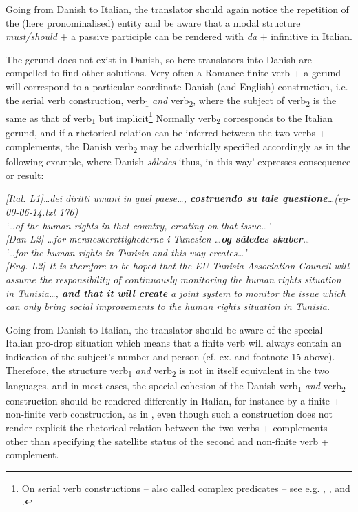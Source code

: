 \documentclass[output=paper]{LSP/langsci}
\begin{document}
Going from Danish to Italian, the translator should again notice the repetition of the (here pronominalised) entity and be aware that a modal structure \textit{must/should }+ a passive participle can be rendered with \textit{da} + infinitive in Italian.

The gerund does not exist in Danish, so here translators into Danish are compelled to find other solutions. Very often a Romance finite verb + a gerund will correspond to a particular coordinate Danish (and English) construction, i.e. the serial verb construction, verb\textsubscript{1} \textit{and} verb\textsubscript{2}, where the subject of verb\textsubscript{2} is the same as that of verb\textsubscript{1} but implicit\footnote{On serial verb constructions -- also called complex predicates -- see e.g. \citet[189]{Lehmann1988}, \citet{Herslund2000}, \citet{Choi2003} and \citet{Aikhenvald2005}.} Normally verb\textsubscript{2} corresponds to the Italian gerund, and if a rhetorical relation can be inferred between the two verbs + complements, the Danish verb\textsubscript{2} may be adverbially specified accordingly as in the following example, where Danish \textit{således} `thus, in this way' expresses consequence or result:

\ea\label{ex:korzen:19}
 \textit{\textup{[Ital. L1]}\ldots dei diritti umani in quel paese\ldots , \textbf{costruendo su tale questione}\ldots  \textup{(ep-00-06-14.txt 176)}\\
  `\ldots of the human rights in that country, creating on that issue\ldots '\\
  \textup{[Dan L2] }\ldots for menneskerettighederne i Tunesien \ldots  \textbf{og således skaber}\ldots \\
  `\ldots for the human rights in Tunisia and this way creates\ldots '\\
  \textup{[Eng. L2]} It is therefore to be hoped that the EU-Tunisia Association Council will assume the responsibility of continuously monitoring the human rights situation in Tunisia\ldots , \textbf{and that it will create} a joint system to monitor the issue which can only bring social improvements to the human rights situation in Tunisia.}\\
\z

Going from Danish to Italian, the translator should be aware of the special Italian pro-drop situation which means that a finite verb will always contain an indication of the subject's number and person (cf. ex.  and footnote 15 above). Therefore, the structure verb\textsubscript{1} \textit{and} verb\textsubscript{2} is not in itself equivalent in the two languages, and in most cases, the special cohesion of the Danish verb\textsubscript{1} \textit{and} verb\textsubscript{2} construction should be rendered differently in Italian, for instance by a finite + non-finite verb construction, as in , even though such a construction does not render explicit the rhetorical relation between the two verbs + complements -- other than specifying the satellite status of the second and non-finite verb + complement.
\end{document}
